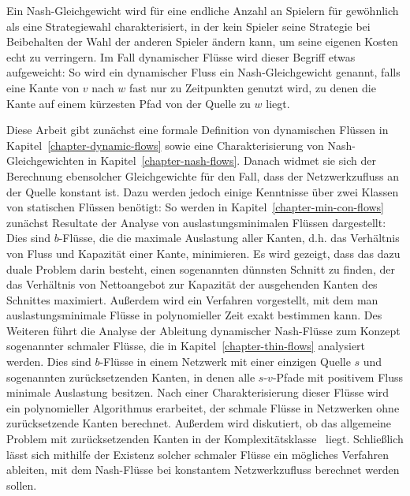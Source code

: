Ein Nash-Gleichgewicht wird für eine endliche Anzahl an Spielern für gewöhnlich als eine Strategiewahl charakterisiert, in der kein Spieler seine Strategie bei Beibehalten der Wahl der anderen Spieler ändern kann, um seine eigenen Kosten echt zu verringern.
Im Fall dynamischer Flüsse wird dieser Begriff etwas aufgeweicht:
So wird ein dynamischer Fluss ein Nash-Gleichgewicht genannt, falls eine Kante von $v$ nach $w$
fast nur zu Zeitpunkten genutzt wird, zu denen die Kante auf einem kürzesten  Pfad von der Quelle zu $w$ liegt.

Diese Arbeit gibt zunächst eine formale Definition von dynamischen Flüssen in Kapitel~\ref{chapter-dynamic-flows} sowie eine Charakterisierung von Nash-Gleichgewichten in Kapitel~\ref{chapter-nash-flows}.
Danach widmet sie sich der Berechnung ebensolcher Gleichgewichte für den Fall, dass der Netzwerkzufluss an der Quelle konstant ist.
Dazu werden jedoch einige Kenntnisse über zwei Klassen von statischen Flüssen benötigt:
So werden in Kapitel~\ref{chapter-min-con-flows} zunächst Resultate der Analyse von auslastungsminimalen Flüssen dargestellt:
Dies sind $b$-Flüsse, die die maximale Auslastung aller Kanten, d.h. das Verhältnis von Fluss und Kapazität einer Kante, minimieren.
Es wird gezeigt, dass das dazu duale Problem darin besteht, einen sogenannten dünnsten Schnitt zu finden, der das Verhältnis von Nettoangebot zur Kapazität der ausgehenden Kanten des Schnittes maximiert.
Außerdem wird ein Verfahren vorgestellt, mit dem man auslastungsminimale Flüsse in polynomieller Zeit exakt bestimmen kann.
Des Weiteren führt die Analyse der Ableitung dynamischer Nash-Flüsse zum Konzept sogenannter schmaler Flüsse, die in Kapitel~\ref{chapter-thin-flows} analysiert werden.
Dies sind $b$-Flüsse in einem Netzwerk mit einer einzigen Quelle $s$ und sogenannten zurücksetzenden Kanten, in denen alle $s$-$v$-Pfade mit positivem Fluss minimale Auslastung besitzen.
Nach einer Charakterisierung dieser Flüsse wird ein polynomieller Algorithmus erarbeitet, der schmale Flüsse in Netzwerken ohne zurücksetzende Kanten berechnet.
Außerdem wird diskutiert, ob das allgemeine Problem mit zurücksetzenden Kanten in der Komplexitätsklasse \PPAD\ liegt.
Schließlich lässt sich mithilfe der Existenz solcher schmaler Flüsse ein mögliches Verfahren ableiten, mit dem Nash-Flüsse bei konstantem Netzwerkzufluss berechnet werden sollen.

